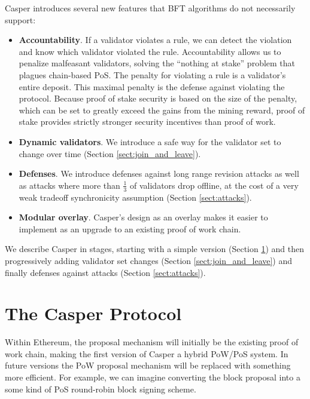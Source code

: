\documentclass[12pt]{article}
\begin{document}
Casper introduces several new features that BFT algorithms do not necessarily support:
\begin{itemize}
\item \textbf{Accountability}.  If a validator violates a rule, we can detect the violation and know which validator violated the rule.  Accountability allows us to penalize malfeasant validators, solving the ``nothing at stake'' problem that plagues chain-based PoS. The penalty for violating a rule is a validator's entire deposit.  This maximal penalty is the defense against violating the protocol.  Because proof of stake security is based on the size of the penalty, which can be set to greatly exceed the gains from the mining reward, proof of stake provides strictly stronger security incentives than proof of work.

\item \textbf{Dynamic validators}. We introduce a safe way for the validator set to change over time (Section \ref{sect:join_and_leave}).

\item \textbf{Defenses}.  We introduce defenses against long range revision attacks as well as attacks where more than $\frac{1}{3}$ of validators drop offline, at the cost of a very weak tradeoff synchronicity assumption (Section \ref{sect:attacks}).

\item \textbf{Modular overlay}.  Casper's design as an overlay makes it easier to implement as an upgrade to an existing proof of work chain.
\end{itemize}

We describe Casper in stages, starting with a simple version (Section \ref{sect:protocol}) and then progressively adding validator set changes (Section \ref{sect:join_and_leave}) and finally defenses against attacks (Section \ref{sect:attacks}).



\section{The Casper Protocol}
\label{sect:protocol}

Within Ethereum, the proposal mechanism will initially be the existing proof of work chain, making the first version of Casper a hybrid PoW/PoS system.  In future versions the PoW proposal mechanism will be replaced with something more efficient.  For example, we can imagine converting the block proposal into a some kind of PoS round-robin block signing scheme.
\end{document}
